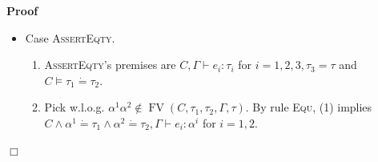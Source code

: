 \documentclass{article}
\newcommand{\nin}{\not\in}
\newcommand{\tmname}[1]{\textsc{#1}}
\newcommand{\tmop}[1]{\ensuremath{\operatorname{#1}}}
\newcommand{\tmstrong}[1]{\textbf{#1}}
\newenvironment{proof}{\noindent\textbf{Proof\ }}{\hspace*{\fill}$\Box$\medskip}
\begin{document}
\begin{proof}
\begin{itemize}
\begin{enumerate}
      \item Pick w.l.o.g. $\alpha^1 \alpha^2 \nin \tmop{FV} (C, \tau_1,
      \tau_2, \Gamma, \tau)$. By rule {\tmname{Equ}}, (1) implies $C \wedge
      \alpha^1 \dot{=} \tau_1 \wedge \alpha^2 \dot{=} \tau_2, \Gamma \vdash
      e_1 : \tmop{Num} (\alpha^1)$, $C \wedge \alpha^1 \dot{=} \tau_1 \wedge
      \alpha^2 \dot{=} \tau_2, \Gamma \vdash e_2 : \tmop{Num} (\alpha^2)$ and
      $C, \Gamma \vdash e_3 : \tau$.
      
      \item By induction hypothesis and weakening, (2) implies $\mathcal{I}_i,
      C \wedge \alpha^1 \dot{=} \tau_1 \wedge \alpha^2 \dot{=} \tau_2 \wedge
      \alpha^1 \leq \alpha^2 \vDash \Phi_i$ for $\Phi_i = \left\llbracket
      \Gamma \vdash e_i : {\nobreak} \tmop{Num} (\alpha^i) \right\rrbracket$,
      $i = 1, 2$, $\Phi_3 = \llbracket \Gamma \vdash e_3 : \tau \rrbracket$.
      
      \item By (2) and nonemptiness of sorts, we have $C \vDash \exists
      \alpha^1 \alpha^2 . (C \wedge \alpha^1 \dot{=} \tau_1 \wedge \alpha^2
      \dot{=} \tau_2 \wedge \alpha^1 \leq \alpha^2)$.
      
      \item By (3), the premise and because $C \vDash D$ implies $\exists
      \alpha .C \vDash \exists \alpha .D$, we have $\mathcal{I}_1
      \mathcal{I}_2 \mathcal{I}_3, \exists \alpha^1 \alpha^2 . (C \wedge
      \alpha^1 \dot{=} \tau_1 \wedge \alpha^2 \dot{=} \tau_2 \wedge \alpha^1
      \leq \alpha^2) \vDash \exists \alpha . (\Phi_1 \wedge \Phi_2 \wedge
      \Phi_3)$.
      
      \item By (4) and (5), we have the goal $\mathcal{I}, C \vDash
      \left\llbracket \Gamma \vdash \text{{\tmstrong{assert num}}} e_1 \leq
      e_2 ; e_3 : \tau \right\rrbracket$ with $\mathcal{I}=\mathcal{I}_1
      \mathcal{I}_2 \mathcal{I}_3$.
    \end{enumerate}
    \item Case {\tmname{AssertEqty}}.
    \begin{enumerate}
      \item {\tmname{AssertEqty}}'s premises are $C, \Gamma \vdash e_i :
      \tau_i$ for $i = 1, 2, 3, \tau_3 = \tau$ and $C \vDash \tau_1 \dot{=}
      \tau_2$.
      
      \item Pick w.l.o.g. $\alpha^1 \alpha^2 \nin \tmop{FV} (C, \tau_1,
      \tau_2, \Gamma, \tau)$. By rule {\tmname{Equ}}, (1) implies $C \wedge
      \alpha^1 \dot{=} \tau_1 \wedge \alpha^2 \dot{=} \tau_2, \Gamma \vdash
      e_i : \alpha^i$ for $i = 1, 2$.
      

\end{enumerate}
\end{itemize}
\end{proof}
\end{document}
